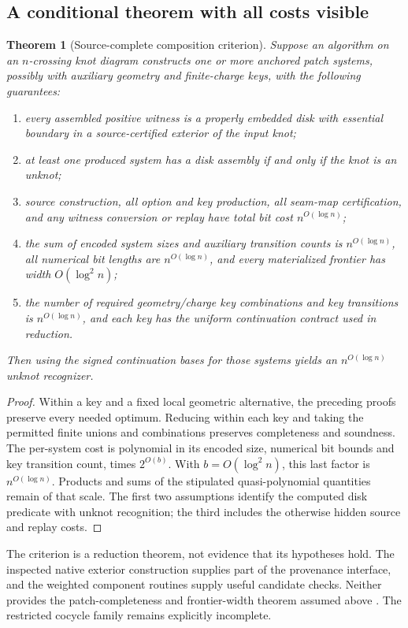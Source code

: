 \documentclass[11pt,letterpaper]{article}
\newtheorem{theorem}{Theorem}[section]
\theoremstyle{definition}
\begin{document}
\subsection{A conditional theorem with all costs visible}
\begin{theorem}[Source-complete composition criterion]\label{thm:composition}
Suppose an algorithm on an $n$-crossing knot diagram constructs one or more anchored patch systems, possibly with auxiliary geometry and finite-charge keys, with the following guarantees:
\begin{enumerate}
\item every assembled positive witness is a properly embedded disk with essential boundary in a source-certified exterior of the input knot;
\item at least one produced system has a disk assembly if and only if the knot is an unknot;
\item source construction, all option and key production, all seam-map certification, and any witness conversion or replay have total bit cost $n^{O(\log n)}$;
\item the sum of encoded system sizes and auxiliary transition counts is $n^{O(\log n)}$, all numerical bit lengths are $n^{O(\log n)}$, and every materialized frontier has width $O(\log^2 n)$;
\item the number of required geometry/charge key combinations and key transitions is $n^{O(\log n)}$, and each key has the uniform continuation contract used in reduction.
\end{enumerate}
Then using the signed continuation bases for those systems yields an $n^{O(\log n)}$ unknot recognizer.
\end{theorem}
\begin{proof}
Within a key and a fixed local geometric alternative, the preceding proofs preserve every needed optimum. Reducing within each key and taking the permitted finite unions and combinations preserves completeness and soundness. The per-system cost is polynomial in its encoded size, numerical bit bounds and key transition count, times $2^{O(b)}$. With $b=O(\log^2 n)$, this last factor is $n^{O(\log n)}$. Products and sums of the stipulated quasi-polynomial quantities remain of that scale. The first two assumptions identify the computed disk predicate with unknot recognition; the third includes the otherwise hidden source and replay costs.
\end{proof}

The criterion is a reduction theorem, not evidence that its hypotheses hold. The inspected native exterior construction supplies part of the provenance interface, and the weighted component routines supply useful candidate checks. Neither provides the patch-completeness and frontier-width theorem assumed above \cite{native}. The restricted cocycle family remains explicitly incomplete.
\end{document}
